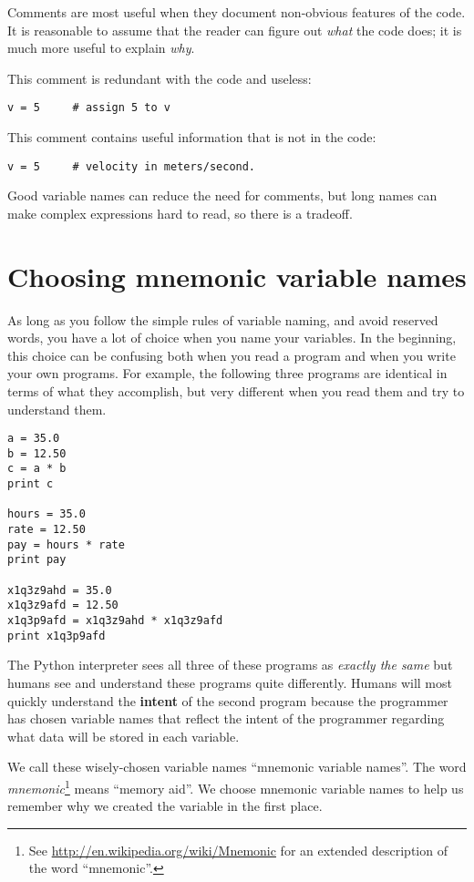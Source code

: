 \begin{ex}
Comments are most useful when they document non-obvious features of
the code.  It is reasonable to assume that the reader can figure out
\emph{what} the code does; it is much more useful to explain \emph{why}.

This comment is redundant with the code and useless:

\beforeverb
\begin{verbatim}
v = 5     # assign 5 to v
\end{verbatim}
\afterverb
%
This comment contains useful information that is not in the code:

\beforeverb
\begin{verbatim}
v = 5     # velocity in meters/second. 
\end{verbatim}
\afterverb
%
Good variable names can reduce the need for comments, but
long names can make complex expressions hard to read, so there is
a tradeoff.

\section{Choosing mnemonic variable names}


As long as you follow the simple rules of variable naming, and avoid
reserved words, you have a lot of choice when you name your variables.
In the beginning, this choice can be confusing both when you read a 
program and when you write your own programs.  For example, the
following three programs are identical in terms of what they accomplish,
but very different when you read them and try to understand them.

\beforeverb
\begin{verbatim}
a = 35.0
b = 12.50
c = a * b
print c

hours = 35.0
rate = 12.50
pay = hours * rate
print pay

x1q3z9ahd = 35.0
x1q3z9afd = 12.50
x1q3p9afd = x1q3z9ahd * x1q3z9afd
print x1q3p9afd
\end{verbatim}
\afterverb
%
The Python interpreter sees all three of these programs as \emph{exactly the 
same} but humans see and understand these programs quite differently.  
Humans will most quickly understand the {\bf intent} 
of the second program because the 
programmer has chosen variable names that reflect the intent of the programmer
regarding what data will be stored in each variable.

We call these wisely-chosen variable names ``mnemonic variable names''.  The
word \emph{mnemonic}\footnote{See 
\url{http://en.wikipedia.org/wiki/Mnemonic}
for an extended description of the word ``mnemonic''.} 
means ``memory aid''.
We choose mnemonic variable names to help us remember why we created the variable
in the first place.


\end{ex}
